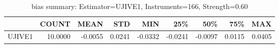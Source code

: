 \begin{table}[ht]
\centering
\caption{bias summary: Estimator=UJIVE1, Instruments=166, Strength=0.60}
\begin{tabular}{lrrrrrrrr}
\toprule
 & COUNT & MEAN & STD & MIN & 25\% & 50\% & 75\% & MAX \\
\midrule
UJIVE1 & 10.0000 & -0.0055 & 0.0241 & -0.0332 & -0.0241 & -0.0097 & 0.0115 & 0.0405 \\
\bottomrule
\end{tabular}
\end{table}
